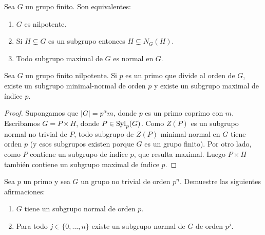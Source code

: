 \begin{exercise}
	\label{xca:normalizadora}
	Sea $G$ un grupo finito. Son equivalentes:
	\begin{enumerate}
		\item $G$ es nilpotente.
		\item Si $H\subsetneq G$ es un subgrupo entonces $H\subsetneq N_G(H)$.
		\item Todo subgrupo maximal de $G$ es normal en $G$.
	\end{enumerate}
\end{exercise}



\begin{theorem}
	Sea $G$ un grupo finito nilpotente. Si $p$ es un primo que divide al orden
	de $G$, existe un subgrupo minimal-normal de orden $p$ y existe un subgrupo
	maximal de índice $p$.
\end{theorem}

\begin{proof}
	Supongamos que $|G|=p^{\alpha}m$, donde $p$ es un primo coprimo con $m$.
	Escribamos $G=P\times H$, donde $P\in\mathrm{Syl}_p(G)$.  Como $Z(P)$ es un
	subgrupo normal no trivial de $P$, todo subgrupo 
	de $Z(P)$ minimal-normal en $G$ tiene orden $p$ (y esos subgrupos 
	existen porque $G$ es un grupo finito). Por otro lado, como $P$ contiene un subgrupo
	de índice $p$, que resulta maximal. Luego $P\times H$ también contiene un
	subgrupo maximal de índice $p$.
\end{proof}

\begin{exercise}
	\label{xca:pgrupos}
	Sea $p$ un primo y sea $G$ un grupo no trivial de orden $p^n$.
	Demuestre las siguientes afirmaciones:
	\begin{enumerate}
		\item $G$ tiene un subgrupo normal de orden $p$.
		\item Para todo $j\in\{0,\dots,n\}$ existe un subgrupo normal de
			$G$ de orden $p^j$. 
	\end{enumerate}
\end{exercise}

